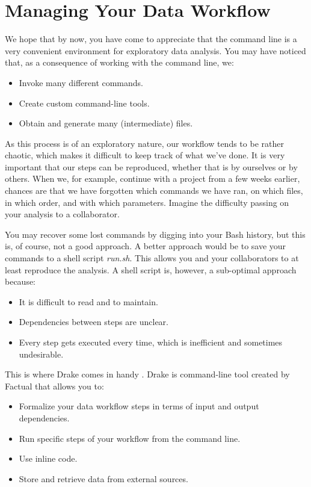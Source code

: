 \documentclass[
]{book}
\providecommand{\tightlist}{%
  \setlength{\itemsep}{0pt}\setlength{\parskip}{0pt}}
\theoremstyle{definition}
\theoremstyle{definition}
\theoremstyle{definition}
\theoremstyle{remark}
\begin{document}
\hypertarget{chapter-6-managing-your-data-workflow}{%
\chapter{Managing Your Data Workflow}\label{chapter-6-managing-your-data-workflow}}

We hope that by now, you have come to appreciate that the command line is a very convenient environment for exploratory data analysis. You may have noticed that, as a consequence of working with the command line, we:

\begin{itemize}
\tightlist
\item
  Invoke many different commands.
\item
  Create custom command-line tools.
\item
  Obtain and generate many (intermediate) files.
\end{itemize}

As this process is of an exploratory nature, our workflow tends to be rather chaotic, which makes it difficult to keep track of what we've done. It is very important that our steps can be reproduced, whether that is by ourselves or by others. When we, for example, continue with a project from a few weeks earlier, chances are that we have forgotten which commands we have ran, on which files, in which order, and with which parameters. Imagine the difficulty passing on your analysis to a collaborator.

You may recover some lost commands by digging into your Bash history, but this is, of course, not a good approach. A better approach would be to save your commands to a shell script \emph{run.sh}. This allows you and your collaborators to at least reproduce the analysis. A shell script is, however, a sub-optimal approach because:

\begin{itemize}
\tightlist
\item
  It is difficult to read and to maintain.
\item
  Dependencies between steps are unclear.
\item
  Every step gets executed every time, which is inefficient and sometimes undesirable.
\end{itemize}

This is where Drake comes in handy \citep{drake}. Drake is command-line tool created by Factual that allows you to:

\begin{itemize}
\tightlist
\item
  Formalize your data workflow steps in terms of input and output dependencies.
\item
  Run specific steps of your workflow from the command line.
\item
  Use inline code.
\item
  Store and retrieve data from external sources.
\end{itemize}
\end{document}
